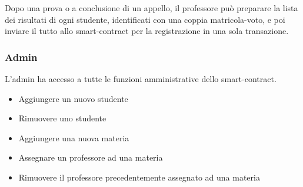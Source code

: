 Dopo una prova o a conclusione di un appello, il professore può preparare la lista dei risultati di ogni studente, identificati con una coppia matricola-voto,
e poi inviare il tutto allo \gls{smart-contract} per la registrazione in una sola transazione.

\subsubsection{Admin}

L'admin ha accesso a tutte le funzioni amministrative dello \gls{smart-contract}.

\begin{itemize}
    \item Aggiungere un nuovo studente
    \item Rimuovere uno studente
    \item Aggiungere una nuova materia
    \item Assegnare un professore ad una materia
    \item Rimuovere il professore precedentemente assegnato ad una materia
\end{itemize}
